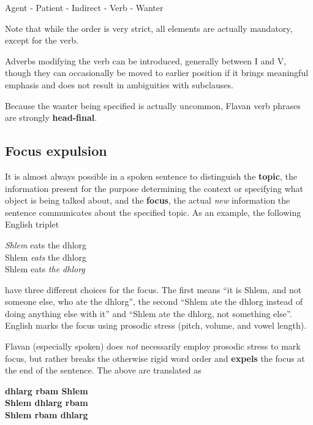 \documentclass[10pt,oneside]{memoir}
\begin{document}
\begin{multicols}{2}
\begin{center}
	Agent - Patient - Indirect - Verb - Wanter
\end{center}

Note that while the order is very strict, all elements are actually mandatory, except for the verb.

Adverbs modifying the verb can be introduced, generally between I and V, though they can occasionally be moved to earlier position if it brings meaningful emphasis and does not result in ambiguities with subclauses.

Because the wanter being specified is actually uncommon, Flavan verb phrases are strongly \textbf{head-final}.

\subsection{Focus expulsion}\label{focus}

It is almost always possible in a spoken sentence to distinguish the \textbf{topic}, the information present for the purpose determining the context or specifying what object is being talked about, and the \textbf{focus}, the actual \emph{new} information the sentence communicates about the specified topic. As an example, the following English triplet

\begin{center}
    \emph{Shlem} eats the dhlorg\\
    Shlem \emph{eats} the dhlorg\\
    Shlem eats \emph{the dhlorg}
\end{center}

have three different choices for the focus. The first means ``it is Shlem, and not someone else, who ate the dhlorg'', the second ``Shlem ate the dhlorg instead of doing anything else with it'' and ``Shlem ate the dhlorg, not something else''. English marks the focus using prosodic stress (pitch, volume, and vowel length).

Flavan (especially spoken) does \emph{not} necessarily employ prosodic stress to mark focus, but rather breaks the otherwise rigid word order and \textbf{expels} the focus at the end of the sentence. The above are translated as

\begin{center}
    \textbf{dhlarg rbam Shlem}\\
    \textbf{Shlem dhlarg rbam}\\
    \textbf{Shlem rbam dhlarg}
\end{center}


\end{multicols}
\end{document}

